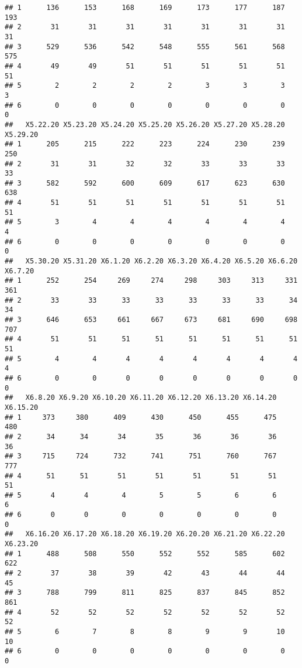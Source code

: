 \documentclass[
]{article}
\begin{document}
\begin{verbatim}
## 1      136      153      168      169      173      177      187      193
## 2       31       31       31       31       31       31       31       31
## 3      529      536      542      548      555      561      568      575
## 4       49       49       51       51       51       51       51       51
## 5        2        2        2        2        3        3        3        3
## 6        0        0        0        0        0        0        0        0
##   X5.22.20 X5.23.20 X5.24.20 X5.25.20 X5.26.20 X5.27.20 X5.28.20 X5.29.20
## 1      205      215      222      223      224      230      239      250
## 2       31       31       32       32       33       33       33       33
## 3      582      592      600      609      617      623      630      638
## 4       51       51       51       51       51       51       51       51
## 5        3        4        4        4        4        4        4        4
## 6        0        0        0        0        0        0        0        0
##   X5.30.20 X5.31.20 X6.1.20 X6.2.20 X6.3.20 X6.4.20 X6.5.20 X6.6.20 X6.7.20
## 1      252      254     269     274     298     303     313     331     361
## 2       33       33      33      33      33      33      33      34      34
## 3      646      653     661     667     673     681     690     698     707
## 4       51       51      51      51      51      51      51      51      51
## 5        4        4       4       4       4       4       4       4       4
## 6        0        0       0       0       0       0       0       0       0
##   X6.8.20 X6.9.20 X6.10.20 X6.11.20 X6.12.20 X6.13.20 X6.14.20 X6.15.20
## 1     373     380      409      430      450      455      475      480
## 2      34      34       34       35       36       36       36       36
## 3     715     724      732      741      751      760      767      777
## 4      51      51       51       51       51       51       51       51
## 5       4       4        4        5        5        6        6        6
## 6       0       0        0        0        0        0        0        0
##   X6.16.20 X6.17.20 X6.18.20 X6.19.20 X6.20.20 X6.21.20 X6.22.20 X6.23.20
## 1      488      508      550      552      552      585      602      622
## 2       37       38       39       42       43       44       44       45
## 3      788      799      811      825      837      845      852      861
## 4       52       52       52       52       52       52       52       52
## 5        6        7        8        8        9        9       10       10
## 6        0        0        0        0        0        0        0        0

\end{verbatim}
\end{document}
